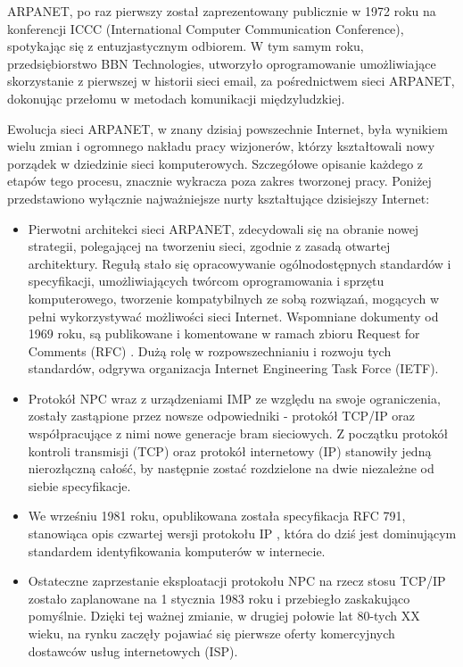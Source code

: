 ARPANET, po raz pierwszy został zaprezentowany publicznie w 1972 roku na konferencji ICCC (International Computer Communication Conference), spotykając się z entuzjastycznym odbiorem. W tym samym roku, przedsiębiorstwo BBN Technologies, utworzyło oprogramowanie umożliwiające skorzystanie z pierwszej w historii sieci email, za pośrednictwem sieci ARPANET, dokonując przełomu w metodach komunikacji międzyludzkiej.

Ewolucja sieci ARPANET, w znany dzisiaj powszechnie Internet, była wynikiem wielu zmian i ogromnego nakładu pracy wizjonerów, którzy kształtowali nowy porządek w dziedzinie sieci komputerowych. Szczegółowe opisanie każdego z etapów tego procesu, znacznie wykracza poza zakres tworzonej pracy. Poniżej przedstawiono wyłącznie najważniejsze nurty kształtujące dzisiejszy Internet:

\begin{itemize}
    \item Pierwotni architekci sieci ARPANET, zdecydowali się na obranie nowej strategii, polegającej na tworzeniu sieci, zgodnie z zasadą otwartej architektury. Regułą stało się opracowywanie ogólnodostępnych standardów i specyfikacji, umożliwiających twórcom oprogramowania i sprzętu komputerowego, tworzenie kompatybilnych ze sobą rozwiązań, mogących w pełni wykorzystywać możliwości sieci Internet. Wspomniane dokumenty od 1969 roku, są publikowane i komentowane w ramach zbioru Request for Comments (RFC) \cite{RFC.index}. Dużą rolę w rozpowszechnianiu i rozwoju tych standardów, odgrywa organizacja Internet Engineering Task Force (IETF).
    \item Protokół NPC wraz z urządzeniami IMP ze względu na swoje ograniczenia, zostały zastąpione przez nowsze odpowiedniki - protokół TCP/IP oraz współpracujące z nimi nowe generacje bram sieciowych. Z początku protokół kontroli transmisji (TCP) oraz protokół internetowy (IP) stanowiły jedną nierozłączną całość, by następnie zostać rozdzielone na dwie niezależne od siebie specyfikacje.
    \item We wrześniu 1981 roku, opublikowana została specyfikacja RFC 791, stanowiąca opis czwartej wersji protokołu IP \cite{RFC.791.IP}, która do dziś jest dominującym standardem identyfikowania komputerów w internecie.
    \item Ostateczne zaprzestanie eksploatacji protokołu NPC na rzecz stosu TCP/IP zostało zaplanowane na 1 stycznia 1983 roku i przebiegło zaskakująco pomyślnie. Dzięki tej ważnej zmianie, w drugiej połowie lat 80-tych XX wieku, na rynku zaczęły pojawiać się pierwsze oferty komercyjnych dostawców usług internetowych (ISP).
\end{itemize}

